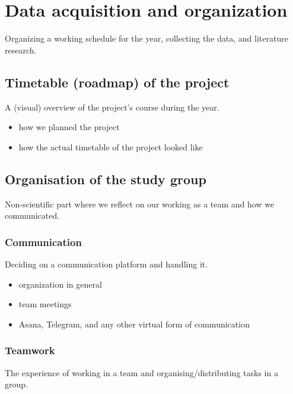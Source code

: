 \section{Data acquisition and organization}

Organizing a working schedule for the year, collecting the data, and literature research.


\subsection{Timetable (roadmap) of the project}

A (visual) overview of the project's course during the year.

\begin{itemize}
\item how we planned the project
\item how the actual timetable of the project looked like
\end{itemize}


\subsection{Organisation of the study group}

Non-scientific part where we reflect on our working as a team and how we communicated.


\subsubsection{Communication}

Deciding on a communication platform and handling it.

\begin{itemize}
\item organization in general
\item team meetings
\item Asana, Telegram, and any other virtual form of communication
\end{itemize}


\subsubsection{Teamwork}

The experience of working in a team and organising/distributing tasks in a group.

